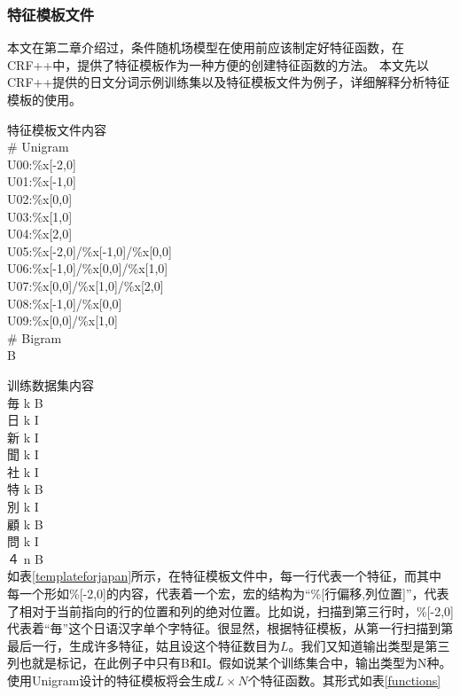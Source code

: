 \subsubsection{特征模板文件}
本文在第二章介绍过，条件随机场模型在使用前应该制定好特征函数，在CRF++中，提供了特征模板作为一种方便的创建特征函数的方法。
本文先以CRF++提供的日文分词示例训练集以及特征模板文件为例子，详细解释分析特征模板的使用。

{特征模板文件内容\\}
{
\# Unigram\\
U00:\%x[-2,0]\\
U01:\%x[-1,0]\\
U02:\%x[0,0]\\
U03:\%x[1,0]\\
U04:\%x[2,0]\\
U05:\%x[-2,0]/\%x[-1,0]/\%x[0,0]\\
U06:\%x[-1,0]/\%x[0,0]/\%x[1,0]\\
U07:\%x[0,0]/\%x[1,0]/\%x[2,0]\\
U08:\%x[-1,0]/\%x[0,0]\\                               
U09:\%x[0,0]/\%x[1,0]\\

\# Bigram\\
B\\
}
{
}

{训练数据集内容\\}
{
毎 k   B\\
日 k   I \\
新 k   I \\
聞 k   I \\
社 k   I \\
特 k   B \\
別 k   I \\
顧 k   B \\
問 k   I \\
４ n   B \\
}
{
}
如表\ref{templateforjapan}所示，在特征模板文件中，每一行代表一个特征，而其中每一个形如\%[-2,0]的内容，代表着一个宏，宏的结构为“\%[行偏移,列位置]”，代表了相对于当前指向的行的位置和列的绝对位置。比如说，扫描到第三行时，\%[-2,0]代表着“毎”这个日语汉字单个字特征。很显然，根据特征模板，从第一行扫描到第最后一行，生成许多特征，姑且设这个特征数目为\(L\)。我们又知道输出类型是第三列也就是标记，在此例子中只有B和I。假如说某个训练集合中，输出类型为N种。使用Unigram设计的特征模板将会生成\(L \times N\)个特征函数。其形式如表\ref{functions}

